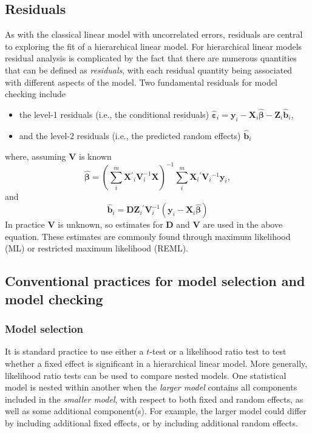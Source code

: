 \documentclass{article} %
\newcommand{\inv}{\ensuremath{^{-1}}}
\newcommand{\trans}{\ensuremath{^\prime}}
\begin{document}
\subsection{Residuals}
As with the classical linear model with uncorrelated errors, residuals are central to exploring the fit of a hierarchical linear model. For hierarchical linear models residual analysis is complicated by the fact that there are numerous quantities that can be defined as \emph{residuals}, with each residual quantity being associated with different aspects of the model. Two fundamental residuals for model checking include
%
\begin{itemize}
\item the level-1 residuals (i.e., the conditional residuals) $\widehat{\bm{\varepsilon}}_i = \bm{y}_i - \bm{X}_i \widehat{\bm{\beta}} - \bm{Z}_i \widehat{\bm{b}}_i$,

\item and the level-2 residuals (i.e., the predicted random effects) $\widehat{\bm{b}}_i$
\end{itemize}
%
where, assuming $\bm{V}$ is known
\begin{equation}\label{eq:glsb}
	\widehat{\bm{\beta}} = 
	\left(\sum^m_i \bm{X}\trans_i \bm{V}^{-1}_i \bm{X} \right)^{-1} 
	\sum^m_i \bm{X}_i\trans \bm{V}_i\inv \bm{y}_i,
\end{equation}
and
\begin{equation}\label{eq:eb}
	\widehat{\bm{b}}_i = \bm{D} \bm{Z}_i\trans \bm{V}_i^{-1} 
	\left(\bm{y}_i - \bm{X}_i \widehat{\bm{\beta}} \right)
\end{equation}
%
In practice $\bm{V}$ is unknown, so estimates for $\bm{D}$ and $\bm{V}$ are used in the above equation. These estimates are commonly found through maximum likelihood (ML) or restricted maximum likelihood (REML).

\subsection{Conventional practices for model selection and model checking}

\subsubsection{Model selection}
It is standard practice to use either a $t$-test or a likelihood ratio test to test whether a fixed effect is significant in a hierarchical linear model. More generally, likelihood ratio tests can be used to compare nested models. One statistical model is nested within another when the \emph{larger model} contains all components included in the \emph{smaller model}, with respect to both fixed and random effects, as well as some additional component(s). For example, the larger model could differ by including additional fixed effects, or by including additional random effects. 
\end{document}
